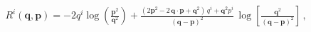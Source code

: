 \begin{align}\label{eq:Rdef}
&R^{i}(\mathbf{q},\mathbf{p})=-2q^{i}\log\left(\frac{\mathbf{p}^{2}}{\mathbf{q}^{2}}\right) +\frac{(2\mathbf{p}^{2}-2\,\mathbf{q}\cdot\mathbf{p}+\mathbf{q}^{2})\,q^{i}+\mathbf{q}^{2}p^{i}}{(\mathbf{q}-\mathbf{p})^{2}}\, \log\left[\frac{\mathbf{q}^{2}}{(\mathbf{q}-\mathbf{p})^{2}}\right]\,,
\end{align}
